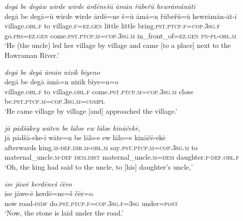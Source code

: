 \ea \label{ZP.41}
\textit{degā be degāw wirde wirde ārdēnešū āmān řūbeřū hewrāmānātī} \\ 
\gll degā be degā=ū wirde wirde ārdē=ne š=ū āmā=n řūbeřū=ū hewrāmān-āt-ī \\ 
 village\textsc{.obl}\textsc{.f} to village\textsc{.f}\textsc{\textsc{=ez.gen}} little little bring\textsc{.pst}\textsc{.ptcp}\textsc{.f}\textsc{=cop}\textsc{.3sg}\textsc{.f} go\textsc{.prs}\textsc{\textsc{=ez.gen}} come\textsc{.pst}\textsc{.ptcp}\textsc{.m}\textsc{=cop}\textsc{.3sg}\textsc{.m} in\_front\_of\textsc{\textsc{=ez.gen}} \textsc{pn}\textsc{\textsc{-pl}}\textsc{-obl}\textsc{.m} \\ 
\glt `He (the uncle) led her village by village and came [to a place] next to the Hawraman River.'
\z 
 
\ea \label{ZP.42}
\textit{degā be degā āmān nizīk bīyeno} \\ 
\gll degā be degā āmā=n nizīk bīye=n=o \\ 
 village\textsc{.obl}\textsc{.f} to village\textsc{.obl}\textsc{.f} come\textsc{.pst}\textsc{.ptcp}\textsc{.m}\textsc{=cop}\textsc{.3sg}\textsc{.m} close be\textsc{.pst}\textsc{.ptcp}\textsc{.m}\textsc{=cop}\textsc{.3sg}\textsc{.m}\textsc{=compl} \\ 
\glt `He came village by village [and] approached the village.'
\z 
 
\ea \label{ZP.43}
\textit{jā pādšākey wāten be lāloe ew lāloe kināčekē,} \\ 
\gll jā pādšā-eke-ī wāte=n be lālo-e ew lālo=e kināčē-ekē \\ 
 afterwards king\textsc{.m}\textsc{-def}\textsc{.dir}\textsc{.m}\textsc{-obl}\textsc{.m} say\textsc{.pst}\textsc{.ptcp}\textsc{.m}\textsc{=cop}\textsc{.3sg}\textsc{.m} to maternal\_uncle\textsc{.m}\textsc{-def} \textsc{dem.dist} maternal\_uncle\textsc{.m}\textsc{=dem} daughter\textsc{.f}\textsc{-def}\textsc{.obl}\textsc{.f} \\ 
\glt `Oh, the king had said to the uncle, to [his] daughter’s uncle,'
\z 
 
\ea \label{ZP.53}
\textit{īse jāwē kerdēneš čēro} \\ 
\gll īse jāwe-ē kerdē=ne=š čēr=o \\ 
 now road\textsc{-indf} do\textsc{.pst}\textsc{.ptcp}\textsc{.f}\textsc{=cop}\textsc{.3sg}\textsc{.f}\textsc{=3sg} under\textsc{=\textsc{post}} \\ 
\glt `Now, the stone is laid under the road.'
\z 
 
